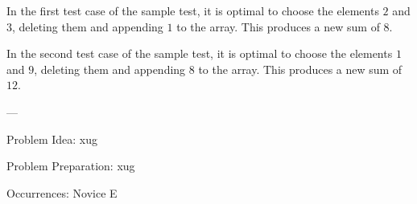 In the first test case of the sample test, it is optimal to choose the elements $2$ and $3$, deleting them and appending $1$ to the array. This produces a new sum of $8$.

In the second test case of the sample test, it is optimal to choose the elements $1$ and $9$, deleting them and appending $8$ to the array. This produces a new sum of $12$.

---

Problem Idea: xug

Problem Preparation: xug

Occurrences: Novice E
